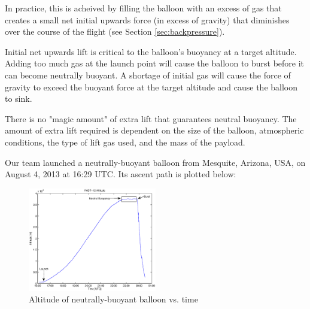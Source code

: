 \documentclass[usenatbib]{mn2e}
\begin{document}
In practice, this is acheived by filling the balloon with an excess of gas that creates a small net initial upwards force (in excess of gravity) that diminishes over the course of the flight (see Section \ref{sec:backpressure}).

Initial net upwards lift is critical to the balloon's buoyancy at a target altitude. Adding too much gas at the launch point will cause the balloon to burst before it can become neutrally buoyant. A shortage of initial gas will cause the force of gravity to exceed the buoyant force at the target altitude and cause the balloon to sink.

There is no "magic amount" of extra lift that guarantees neutral buoyancy. The amount of extra lift required is dependent on the size of the balloon, atmospheric conditions, the type of lift gas used, and the mass of the payload.

Our team launched a neutrally-buoyant balloon from Mesquite, Arizona, USA, on August 4, 2013 at 16:29 UTC.
Its ascent path is plotted below:

\begin{figure}[!ht]
\begin{center}
  \includegraphics[width=0.5\textwidth]{altitude.eps}
  \caption{Altitude of neutrally-buoyant balloon vs. time}
\end{center}
\end{figure}



\label{lastpage}

\end{document}
